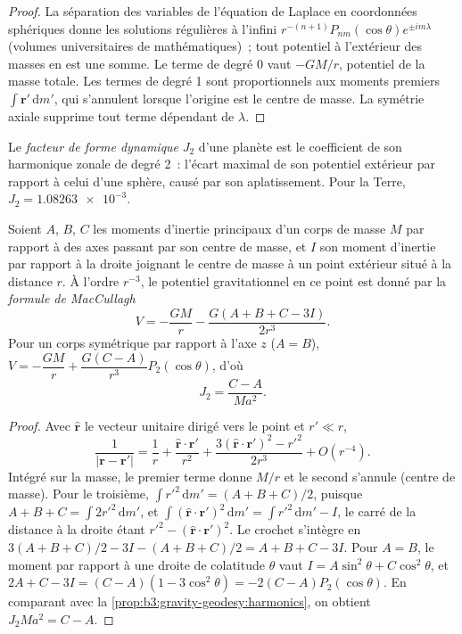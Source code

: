 \begin{proof}
La séparation des variables de l'équation de Laplace en coordonnées sphériques
donne les solutions régulières à l'infini $r^{-(n+1)}P_{nm}(\cos\theta)e^{\pm
im\lambda}$ (volumes universitaires de mathématiques)~; tout potentiel à l'extérieur
des masses en est une somme. Le terme de degré 0 vaut $-GM/r$, potentiel de
la masse totale. Les termes de degré 1 sont proportionnels aux moments
premiers $\int\mathbf r'\,\mathrm dm'$, qui s'annulent lorsque l'origine est le centre de
masse. La symétrie axiale supprime tout terme dépendant de $\lambda$.
\end{proof}

\begin{definition}\label{def:b3:gravity-geodesy:j2}
Le \emph{facteur de forme dynamique} $J_2$ d'une planète
est le coefficient de son harmonique zonale de degré 2~: l'écart maximal de son
potentiel extérieur par rapport à celui d'une sphère, causé par son aplatissement. Pour la
Terre, $J_2 = \num{1.08263e-3}$.
\end{definition}

\begin{theorem}\label{thm:b3:gravity-geodesy:maccullagh}
Soient $A$, $B$, $C$ les moments d'inertie principaux d'un corps de masse $M$
par rapport à des axes passant par son centre de masse, et $I$ son moment d'inertie par rapport à la
droite joignant le centre de masse à un point extérieur situé à la distance $r$. À l'ordre
$r^{-3}$, le potentiel gravitationnel en ce point est donné par la
\emph{formule de MacCullagh}
\[
  V = -\frac{GM}{r} - \frac{G(A + B + C - 3I)}{2r^3} .
\]
Pour un corps symétrique par rapport à l'axe $z$ ($A = B$),
$V = -\dfrac{GM}{r} + \dfrac{G(C - A)}{r^3}P_2(\cos\theta)$, d'où
\[
  J_2 = \frac{C - A}{Ma^2} .
\]
\end{theorem}

\begin{proof}
Avec $\hat{\mathbf r}$ le vecteur unitaire dirigé vers le point et $r' \ll r$,
\[
  \frac{1}{|\mathbf r - \mathbf r'|} = \frac1r + \frac{\hat{\mathbf r}\cdot\mathbf r'}{r^2}
  + \frac{3(\hat{\mathbf r}\cdot\mathbf r')^2 - r'^2}{2r^3} + O(r^{-4}).
\]
Intégré sur la masse, le premier terme donne $M/r$ et le second s'annule
(centre de masse). Pour le troisième, $\int r'^2\,\mathrm dm' = (A + B + C)/2$, puisque
$A + B + C = \int 2r'^2\,\mathrm dm'$, et $\int(\hat{\mathbf r}\cdot\mathbf
r')^2\,\mathrm dm' = \int r'^2\,\mathrm dm' - I$, le carré de la distance à
la droite étant $r'^2 - (\hat{\mathbf r}\cdot\mathbf r')^2$. Le crochet s'intègre
en $3(A + B + C)/2 - 3I - (A + B + C)/2 = A + B + C - 3I$. Pour $A = B$, le
moment par rapport à une droite de colatitude $\theta$ vaut $I = A\sin^2\theta + C\cos^2\theta$,
et $2A + C - 3I = (C - A)(1 - 3\cos^2\theta) = -2(C - A)P_2(\cos\theta)$.
En comparant avec la \cref{prop:b3:gravity-geodesy:harmonics}, on obtient
$J_2Ma^2 = C - A$.
\end{proof}

